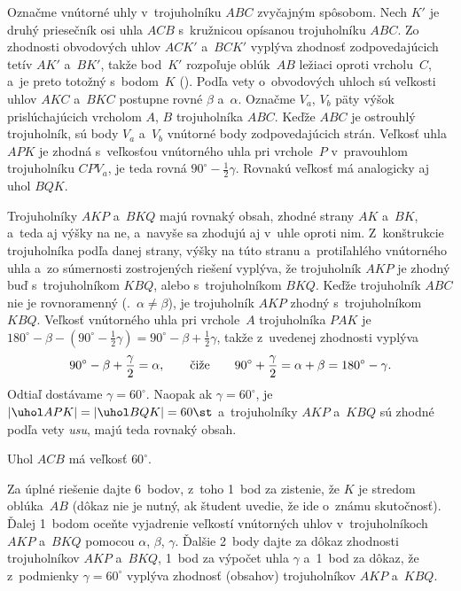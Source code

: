 {%
Označme vnútorné uhly v~trojuholníku $ABC$ zvyčajným spôsobom. Nech $K'$ je druhý priesečník osi uhla $ACB$ s~kružnicou opísanou trojuholníku $ABC$. Zo zhodnosti obvodových uhlov $ACK'$ a~$BCK'$ vyplýva zhodnosť zodpovedajúcich tetív $AK'$ a~$BK'$, takže bod~$K'$ rozpoľuje oblúk~$AB$ ležiaci oproti vrcholu~$C$, a~je preto totožný s~bodom~$K$ (\obr). Podľa vety o~obvodových uhloch sú
%
veľkosti uhlov $AKC$ a~$BKC$ postupne rovné $\beta$ a~$\alpha$. Označme $V_a$, $V_b$ päty výšok prislúchajúcich vrcholom $A$, $B$ trojuholníka $ABC$. Keďže $ABC$ je ostrouhlý trojuholník, sú body $V_a$ a~$V_b$ vnútorné body zodpovedajúcich strán. Veľkosť uhla $APK$ je zhodná s~veľkosťou vnútorného uhla pri vrchole~$P$ v~pravouhlom trojuholníku $CPV_a$, je teda rovná $90^\circ-\frac12\gamma$. Rovnakú veľkosť má analogicky aj uhol $BQK$.

Trojuholníky $AKP$ a~$BKQ$ majú rovnaký obsah, zhodné strany $AK$ a~$BK$, a~teda aj výšky na ne, a~navyše sa zhodujú aj v~uhle oproti nim. Z~konštrukcie trojuholníka podľa danej strany, výšky na túto stranu a~protiľahlého vnútorného uhla a~zo súmernosti zostrojených riešení vyplýva, že trojuholník $AKP$ je zhodný buď s~trojuholníkom $KBQ$, alebo s~trojuholníkom $BKQ$. Keďže trojuholník $ABC$ nie je rovnoramenný (\tj.~$\alpha\ne\beta$), je trojuholník $AKP$ zhodný
s~trojuholníkom $KBQ$. Veľkosť vnútorného uhla pri vrchole~$A$ trojuholníka $PAK$ je
$180^\circ-\beta-(90^\circ-\frac12\gamma)=90^\circ-\beta+\frac12\gamma$,
takže z~uvedenej zhodnosti vyplýva
$$
90^\circ-\beta+\frac\gamma2=\alpha, \qquad \hbox{čiže}\qquad 90^\circ+\frac\gamma2=
\alpha+\beta=180^\circ-\gamma.
$$
Odtiaľ dostávame $\gamma=60^\circ$. Naopak ak $\gamma=60^\circ$, je $|\uhol APK|=|\uhol BQK|=60\st$ a~trojuholníky $AKP$ a~$KBQ$ sú zhodné podľa vety {\it usu}, majú teda rovnaký obsah.

\zaver
Uhol $ACB$ má veľkosť $60^\circ$.

\nobreak\medskip\petit\noindent
Za úplné riešenie dajte 6~bodov, z~toho 1~bod za zistenie, že $K$ je stredom oblúka~$AB$ (dôkaz nie je nutný, ak študent uvedie, že ide o~známu skutočnosť). Ďalej 1~bodom oceňte vyjadrenie veľkostí vnútorných uhlov v~trojuholníkoch $AKP$ a~$BKQ$ pomocou $\alpha$, $\beta$, $\gamma$. Ďalšie 2~body dajte za dôkaz zhodnosti trojuholníkov $AKP$ a~$BKQ$, 1~bod za výpočet uhla $\gamma$ a~1~bod za dôkaz, že z~podmienky $\gamma=60^\circ$ vyplýva zhodnosť (obsahov)
trojuholníkov $AKP$ a~$KBQ$.
\endpetit
\bigbreak}

